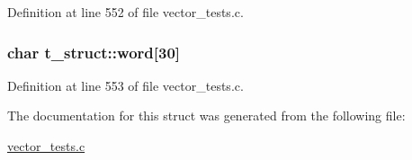 \-Definition at line 552 of file vector\-\_\-tests.\-c.

\hypertarget{structt__struct_ab5b290b572fc4036f1e5efc671098c7f}{
\subsubsection[{word}]{\setlength{\rightskip}{0pt plus 5cm}char {\bf t\-\_\-struct\-::word}\mbox{[}30\mbox{]}}}\label{structt__struct_ab5b290b572fc4036f1e5efc671098c7f}


\-Definition at line 553 of file vector\-\_\-tests.\-c.



\-The documentation for this struct was generated from the following file\-:\begin{DoxyCompactItemize}
\item 
\hyperlink{vector__tests_8c}{vector\-\_\-tests.\-c}\end{DoxyCompactItemize}
